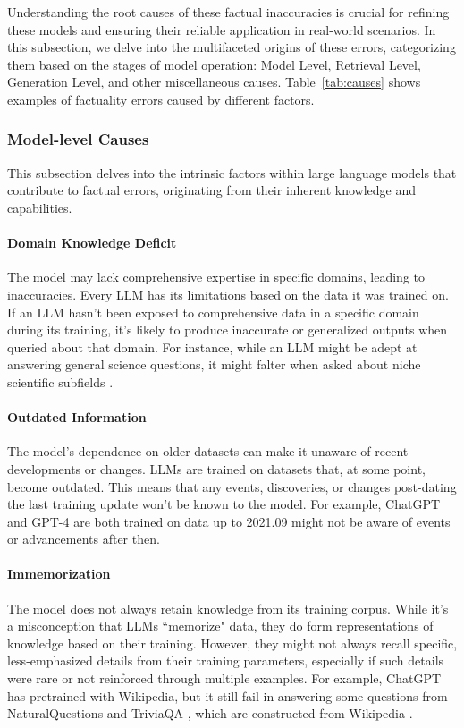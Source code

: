 
Understanding the root causes of these factual inaccuracies is crucial for refining these models and ensuring their reliable application in real-world scenarios. In this subsection, we delve into the multifaceted origins of these errors, categorizing them based on the stages of model operation: Model Level, Retrieval Level, Generation Level, and other miscellaneous causes. Table~\ref{tab:causes} shows examples of factuality errors caused by different factors.


\subsubsection{Model-level Causes}
\label{sec:model-causes}
This subsection delves into the intrinsic factors within large language models that contribute to factual errors, originating from their inherent knowledge and capabilities. 

\paragraph{Domain Knowledge Deficit} The model may lack comprehensive expertise in specific domains, leading to inaccuracies. Every LLM has its limitations based on the data it was trained on. If an LLM hasn't been exposed to comprehensive data in a specific domain during its training, it's likely to produce inaccurate or generalized outputs when queried about that domain. For instance, while an LLM might be adept at answering general science questions, it might falter when asked about niche scientific subfields \citep{ScienceQA}.

\paragraph{Outdated Information} The model's dependence on older datasets can make it unaware of recent developments or changes. LLMs are trained on datasets that, at some point, become outdated. This means that any events, discoveries, or changes post-dating the last training update won't be known to the model. For example, ChatGPT and GPT-4 are both trained on data up to 2021.09 might not be aware of events or advancements after then.

\paragraph{Immemorization} The model does not always retain knowledge from its training corpus. While it's a misconception that LLMs ``memorize" data, they do form representations of knowledge based on their training. However, they might not always recall specific, less-emphasized details from their training parameters, especially if such details were rare or not reinforced through multiple examples. For example, ChatGPT has pretrained with Wikipedia, but it still fail in answering some questions from NaturalQuestions \citep{NQ} and TriviaQA \citep{TQ}, which are constructed from Wikipedia \citep{wang2023evaluating}.

